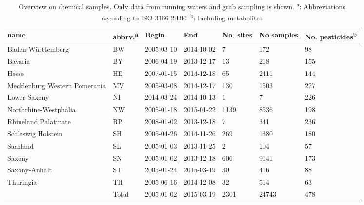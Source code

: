 \begin{table}[ht]
\centering
\caption[Overview on chemical samples.]{Overview on chemical samples. Only data from running waters and grab
sampling is shown. \textsuperscript{a}: Abbreviations according to ISO 3166-2:DE. 
      \textsuperscript{b}: Including metabolites} 
\label{tab:phch_overview}
\begin{tabular}{p{2.7cm}lllR{2cm}R{2cm}R{2cm}}
  \toprule
name & abbrv.\textsuperscript{a} & Begin & End & No. sites & No.samples & No. pesticides\textsuperscript{b} \\ 
  \midrule
Baden-Württemberg & BW & 2005-03-10 & 2014-10-02 & 7 & 172 & 98 \\ 
  Bavaria & BY & 2006-04-19 & 2013-12-17 & 13 & 218 & 155 \\ 
  Hesse & HE & 2007-01-15 & 2014-12-18 & 65 & 2411 & 144 \\ 
  Mecklenburg Western Pomerania & MV & 2005-03-08 & 2014-12-17 & 130 & 1503 & 227 \\ 
  Lower Saxony & NI & 2014-03-24 & 2014-10-13 & 1 & 7 & 226 \\ 
  Northrhine-Westphalia & NW & 2005-01-18 & 2015-01-22 & 1139 & 8536 & 198 \\ 
  Rhineland Palatinate & RP & 2008-01-02 & 2013-12-18 & 7 & 341 & 236 \\ 
  Schleswig Holstein & SH & 2005-04-26 & 2014-11-26 & 269 & 1380 & 180 \\ 
  Saarland & SL & 2005-01-03 & 2013-11-25 & 2 & 104 & 57 \\ 
  Saxony & SN & 2005-01-02 & 2013-12-18 & 606 & 9141 & 173 \\ 
  Saxony-Anhalt & ST & 2005-01-24 & 2015-03-19 & 30 & 416 & 88 \\ 
  Thuringia & TH & 2005-06-16 & 2014-12-08 & 32 & 514 & 63 \\ 
   \midrule
 & Total & 2005-01-02 & 2015-03-19 & 2301 & 24743 & 478 \\ 
   \bottomrule
\end{tabular}
\end{table}

